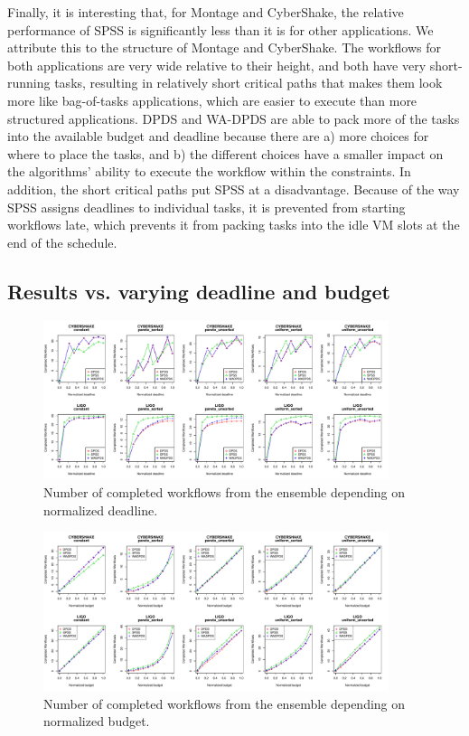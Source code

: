 \documentclass[preprint,5p]{elsarticle}
\begin{document}
Finally, it is interesting that, for Montage and CyberShake, the
relative performance of SPSS is significantly less than it is for other
applications. We attribute this to the structure of Montage and CyberShake.
The workflows for both applications are very wide relative to their height,
and both have very short-running tasks, resulting  in relatively short
critical paths that makes them look more like bag-of-tasks applications, which are easier
to execute than more structured applications. DPDS and WA-DPDS are able to
pack more of the tasks into the available budget and deadline because there
are a) more choices for where to place the tasks, and b) the different choices
have a smaller impact on the algorithms' ability to execute the workflow
within the constraints. In addition, the short critical paths put SPSS at a
disadvantage. Because of the way SPSS assigns deadlines to individual tasks,
it is prevented from starting workflows late, which prevents it from packing
tasks into the idle VM slots at the end of the schedule.

\subsection{Results vs. varying deadline and budget}


\begin{figure}[htb]
    \centering
    \includegraphics[width=0.9\textwidth]{run-finish-variations-test-0-output-deadlines-app-dist-selected}    
    \caption{Number of completed workflows from the ensemble depending on normalized deadline.}
    \label{fig:completed-deadlines}
\end{figure}
\begin{figure}[htb]
    \centering
    \includegraphics[width=0.9\textwidth]{run-finish-variations-test-0-output-budgets-app-dist-selected}    
    \caption{Number of completed workflows from the ensemble depending on normalized budget.}
    \label{fig:completed-budgets}
\end{figure}
\end{document}
